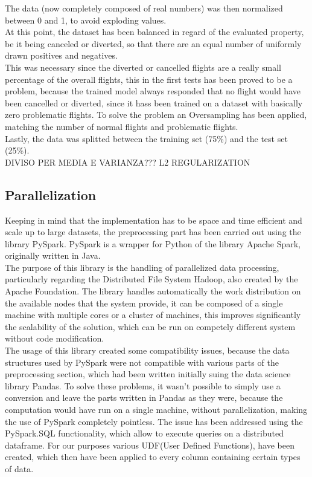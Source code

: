 \documentclass[
	letterpaper, %
	10pt, %
]{class}
\begin{document}
The data (now completely composed of real numbers) was then normalized between 0 and 1, to avoid exploding values.\\

At this point, the dataset has been balanced in regard of the evaluated property, be it being canceled or diverted, so that there are an equal number of uniformly drawn positives and negatives.\\

This was necessary since the diverted or cancelled flights are a really small percentage of the overall flights,
this in the first tests has been proved to be a problem, because the trained model always responded that no flight would have been cancelled or diverted, since it hass been trained on a dataset with basically zero problematic flights.
To solve the problem an Oversampling has been applied, matching the number of normal flights and problematic flights.\\

Lastly, the data was splitted between the training set (75\%) and the test set (25\%).\\

DIVISO PER MEDIA E VARIANZA??? L2 REGULARIZATION

\subsection{Parallelization}

Keeping in mind that the implementation has to be space and time efficient and scale up to large datasets, the preprocessing part has been carried out using the library PySpark.
PySpark is a wrapper for Python of the library Apache Spark, originally written in Java.\\

The purpose of this library is the handling of parallelized data processing, particularly regarding the Distributed File System Hadoop, also created by the Apache Foundation.
The library handles automatically the work distribution on the available nodes that the system provide, it can be composed of a single machine with multiple cores or a cluster of machines, this improves significantly the scalability of the solution, which can be run on competely different system without code modification.\\

The usage of this library created some compatibility issues, because the data structures used by PySpark were not compatible with various parts of the preprocessing section, which had been written initially suing the data science library Pandas.
To solve these problems, it wasn't possible to simply use a conversion and leave the parts written in Pandas as they were, because the computation would have run on a single machine, without parallelization, making the use of PySpark completely pointless.
The issue has been addressed using the PySpark.SQL functionality, which allow to execute queries on a distributed dataframe. For our purposes various UDF(User Defined Functions), have been created, which then have been applied to every column containing certain types of data.\\
\end{document}
